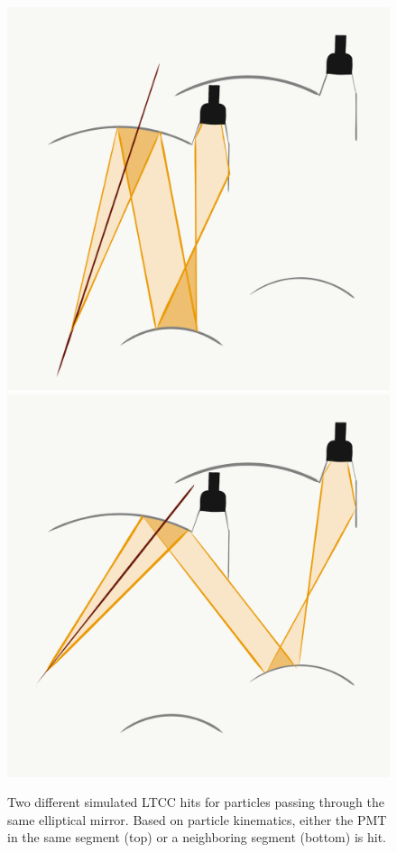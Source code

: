 \begin{figure}
  \centering
  \includegraphics[width=0.99\columnwidth,keepaspectratio]{img/LTCC-event-1.png}
  \includegraphics[width=0.99\columnwidth,keepaspectratio]{img/LTCC-event-2.png}
  \caption{Two different simulated LTCC hits for particles passing through the same elliptical mirror. Based on
    particle kinematics, either the PMT in the same segment (top) or a neighboring segment (bottom) is hit.}
  \label{fig:trackmatching}
\end{figure}

